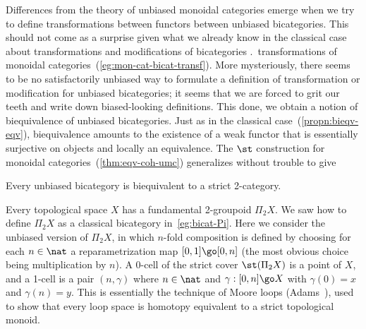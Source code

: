 Differences from the theory of unbiased monoidal categories emerge when we
try to define transformations between functors between unbiased
bicategories.  This should not come as a surprise given what we already
know in the classical case about transformations and modifications of
bicategories \vs.\ transformations of monoidal
categories~(\ref{eg:mon-cat-bicat-transf}).  More mysteriously, there seems
to be no satisfactorily unbiased way to formulate a definition of
transformation%
%
%
%
%
or modification%
%
%
%
% 
for unbiased bicategories; it seems that we are forced to grit our teeth
and write down biased-looking definitions.  This done, we obtain a notion
of biequivalence%
%
%
of unbiased bicategories.  Just as in the classical
case~(\ref{propn:bieqv-eqv}), biequivalence amounts to the existence of a
weak functor that is essentially surjective on objects and locally an
equivalence.  The $\st$%
% 
% 
construction for monoidal
categories~(\ref{thm:eqv-coh-umc}) generalizes without trouble to give

\begin{thm}	%
%
%
Every unbiased bicategory is biequivalent to a strict 2-category.  
\done
\end{thm}

\begin{example}
Every topological space $X$ has a fundamental%
%
%
2-groupoid $\Pi_2 X$.%
% 
% 
 We
saw how to define $\Pi_2 X$ as a classical bicategory
in~\ref{eg:bicat-Pi}.  Here we consider the unbiased version of $\Pi_2 X$,
in which $n$-fold composition is defined by choosing for each $n\in\nat$ a
reparametrization map $[0,1] \go [0,n]$ (the most obvious choice being
multiplication by $n$).  A 0-cell of the strict%
%
%
cover $\st(\Pi_2 X)$ is
a point of $X$, and a 1-cell is a pair $(n,\gamma)$ where $n\in\nat$ and
$\gamma: [0,n] \go X$ with $\gamma(0) = x$ and $\gamma(n) = y$.  This is
essentially the technique of Moore%
%
%
loops (Adams~\cite[p.~31]{Ad}), used to show that every loop space is
homotopy equivalent to a strict topological monoid.
\end{example}


